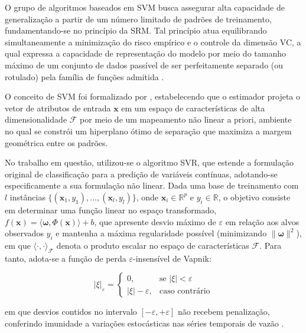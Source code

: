 O grupo de algoritmos baseados em \gls{SVM} busca assegurar alta capacidade de generalização a partir de um número limitado de padrões de treinamento, fundamentando-se no princípio da \gls{SRM}. Tal princípio atua equilibrando simultaneamente a minimização do risco empírico e o controle da dimensão \gls{VC}, a qual expressa a capacidade de representação do modelo por meio do tamanho máximo de um conjunto de dados passível de ser perfeitamente separado (ou rotulado) pela família de funções admitida \cite{basak_svr}. 

O conceito de \gls{SVM} foi formalizado por , estabelecendo que o estimador projeta o vetor de atributos de entrada $\mathbf{x}$ em um espaço de características de alta dimensionalidade $\mathcal{F}$ por meio de um mapeamento não linear a priori, ambiente no qual se constrói um hiperplano ótimo de separação que maximiza a margem geométrica entre os padrões.

No trabalho em questão, utilizou-se o algoritmo \gls{SVR}, que estende a formulação original de classificação para a predição de variáveis contínuas, adotando-se especificamente a sua formulação não linear. Dada uma base de treinamento com $l$ instâncias $\{(\mathbf{x}_1, y_1), \dots, (\mathbf{x}_l, y_l)\}$, onde $\mathbf{x}_i \in \mathbb{R}^p$ e $y_i \in \mathbb{R}$, o objetivo consiste em determinar uma função linear no espaço transformado, $f(\mathbf{x}) = \langle \boldsymbol{\omega}, \Phi(\mathbf{x}) \rangle + b$, que apresente desvio máximo de $\varepsilon$ em relação aos alvos observados $y_i$ e mantenha a máxima regularidade possível (minimizando $\|\boldsymbol{\omega}\|^2$), em que $\langle \cdot, \cdot \rangle_{\mathcal{F}}$ denota o produto escalar no espaço de características $\mathcal{F}$. Para tanto, adota-se a função de perda $\varepsilon$-insensível de Vapnik:

\begin{equation}
    |\xi|_\varepsilon = 
    \begin{cases}
        0, & \text{se } |\xi| < \varepsilon \\
        |\xi| - \varepsilon, & \text{caso contrário}
    \end{cases} 
    \label{eq:perda_epsilon}
\end{equation}

\noindent em que desvios contidos no intervalo $[-\varepsilon, +\varepsilon]$ não recebem penalização, conferindo imunidade a variações estocásticas nas séries temporais de vazão \cite{basak_svr}.

